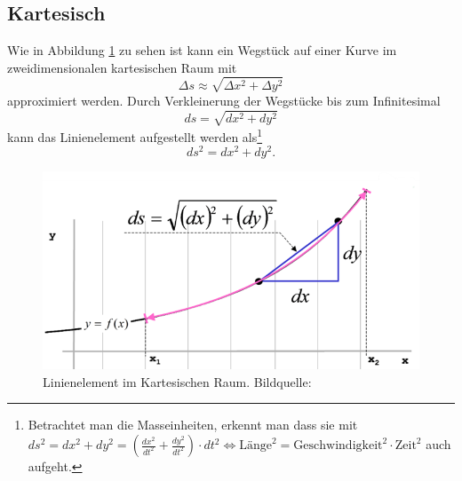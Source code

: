 %
%
%
%
\subsection{Kartesisch\label{geodaeten:section:Linienelemente:Kartesisch}}

Wie in Abbildung \ref{geodaeten:figure:Linienelemente:Kartesisch:figure1} zu sehen ist kann ein Wegstück auf einer Kurve im zweidimensionalen kartesischen Raum mit
\begin{equation}
	\Delta s \approx \sqrt{\Delta x^2 + \Delta y^2}
\end{equation}
approximiert werden.
Durch Verkleinerung der Wegstücke bis zum Infinitesimal 
\begin{equation}
	d s = \sqrt{d x^2 + d y^2}
\end{equation}
kann das Linienelement aufgestellt werden als\footnote{
Betrachtet man die Masseinheiten, erkennt man dass sie mit $ds^2 = dx^2 + dy^2 = \left( \frac{dx^2}{dt^2}+\frac{dy^2}{dt^2} \right) \cdot dt^2 \Leftrightarrow \text{Länge}^2 = \text{Geschwindigkeit}^2 \cdot \text{Zeit}^2$ auch aufgeht.
}
\begin{equation}
 	ds^2 = d x^2 + d y^2.
 	\label{geodaeten:equation:Linienelemente:Kartesisch:equation1}
\end{equation}

\begin{figure}
	\centering
	
	\includegraphics[width=0.7\linewidth]{papers/geodaeten/Abbildungen/Linienelemente/LinKartes1}
	\caption{Linienelement im Kartesischen Raum. Bildquelle: \cite{geodaeten:kartesisch}} 
	\label{geodaeten:figure:Linienelemente:Kartesisch:figure1}	
\end{figure}
